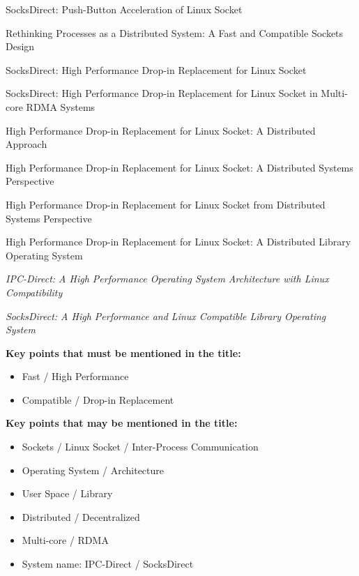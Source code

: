 SocksDirect: Push-Button Acceleration of Linux Socket

Rethinking Processes as a Distributed System: A Fast and Compatible Sockets Design

SocksDirect: High Performance Drop-in Replacement for Linux Socket

SocksDirect: High Performance Drop-in Replacement for Linux Socket in Multi-core RDMA Systems

High Performance Drop-in Replacement for Linux Socket: A Distributed Approach

High Performance Drop-in Replacement for Linux Socket: A Distributed Systems Perspective

High Performance Drop-in Replacement for Linux Socket from Distributed Systems Perspective

High Performance Drop-in Replacement for Linux Socket: A Distributed Library Operating System

\textit{IPC-Direct: A High Performance Operating System Architecture with Linux Compatibility}

\textit{SocksDirect: A High Performance and Linux Compatible Library Operating System}

\textbf{Key points that must be mentioned in the title:}

\begin{itemize}
	\item Fast / High Performance
	\item Compatible / Drop-in Replacement
\end{itemize}

\textbf{Key points that may be mentioned in the title:}

\begin{itemize}
	\item Sockets / Linux Socket / Inter-Process Communication
	\item Operating System / Architecture
	\item User Space / Library
	\item Distributed / Decentralized
	\item Multi-core / RDMA
	\item System name: IPC-Direct / SocksDirect
\end{itemize}
\fi